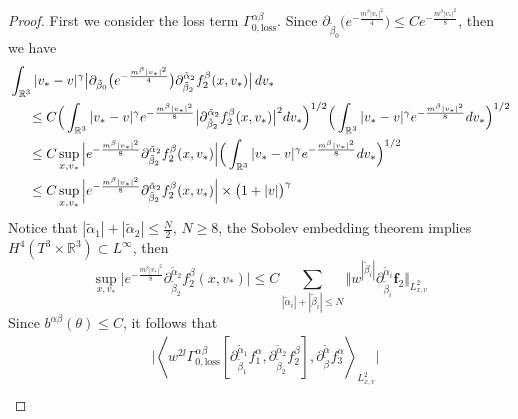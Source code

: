 \documentclass[reqno]{amsart}
\numberwithin{equation}{section}
\numberwithin{equation}{section}
\begin{document}
		
		
		\begin{proof}
		First we consider the loss term $\Gamma_{0,\text{loss}}^{\alpha \beta}$. Since  $\partial_{\tilde{\beta}_0} \big(e^{-\frac{m^{\beta}|v_*|^2}{4}}\big)  \leq C  e^{-\frac{m^{\beta}|v_*|^2}{8}} $, then we have
		\begin{align*}
			&\int_{\mathbb{R}^3}  |v_* - v|^\gamma 
			\big| \partial_{\tilde{\beta}_0}  \big(e^{-\frac{m^{\beta}|v_*|^2}{4}}\big) 
			 \partial_{\tilde{\beta}_2}^{\tilde{\alpha}_2}f^{\beta}_2 (x,v_*)\big| 
			 \, dv_* \\
			&\hspace{0.5cm} \leq C \Big( \int_{\mathbb{R}^3} |v_* - v|^{\gamma} e^{-\frac{m^{\beta}|v_*|^2}{8}} \big| \partial_{\tilde{\beta}_2}^{\tilde{\alpha}_2}f^{\beta}_2 (x,v_*) \big|^2 dv_* \Big)^{1/2} 
			 \Big( \int_{\mathbb{R}^3} |v_* - v|^{\gamma} e^{-\frac{m^{\beta}|v_*|^2}{8}} dv_* \Big)^{1/2} \\
			&\hspace{0.5cm} \leq C \sup_{x,v_*} \Big| e^{-\frac{m^{\beta}|v_*|^2}{8}} \partial_{\tilde{\beta}_2}^{\tilde{\alpha}_2}f^{\beta}_2 (x,v_*) \Big| \Big( \int_{\mathbb{R}^3} |v_* - v|^{\gamma} e^{-\frac{m^{\beta}|v_*|^2}{8}} dv_* \Big)^{1/2} \\
			&\hspace{0.5cm} \leq C \sup_{x,v_*} \Big| e^{-\frac{m^{\beta}|v_*|^2}{8}} \partial_{\tilde{\beta}_2}^{\tilde{\alpha}_2}f^{\beta}_2 (x,v_*) \Big| \times \big(1 + |v|\big)^\gamma
		\end{align*}
		Notice that $|\tilde{\alpha}_1|+|\tilde{\alpha}_2|\leq \frac{N}{2}$, $N\geq 8$, the Sobolev embedding theorem implies $H^4(T^3 \times \mathbb{R}^3) \subset L^\infty
		$, then
		\begin{equation*}
			 \sup_{x,v_*} \Big| e^{-\frac{m^{\beta}|v_*|^2}{8}} \partial_{\tilde{\beta}_2}^{\tilde{\alpha}_2}f^{\beta}_2 (x,v_*) \Big| \leq C \sum_{|\tilde{\alpha}_i|+|\tilde{\beta}_i|\leq N}\big\Vert w^{|\tilde{\beta}_i|}\partial_{\tilde{\beta}_i}^{\tilde{\alpha}_i}\mathbf{f}_2\big\Vert_{L^{2}_{x,v}}
		\end{equation*}
		Since $b^{\alpha\beta}(\theta)\leq C$, it follows that
		\begin{align*}
			&	\Big| \left\langle w^{2l} \Gamma_{0,\text{loss}}^{\alpha \beta} [\partial_{\tilde{\beta}_1}^{\tilde{\alpha}_1}f^{\alpha}_1, \partial_{\tilde{\beta}_2}^{\tilde{\alpha}_2}f^{\beta}_2],  \partial_{\tilde{\beta}}^{\tilde{\alpha}}f^{\alpha}_3 \right\rangle_{L_{x,v}^2} \Big|	\\

\end{align*}
\end{proof}
\end{document}
